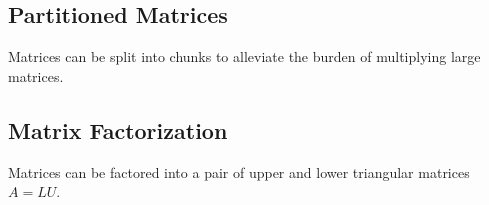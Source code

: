 \begin{card}
    \subsection{Partitioned Matrices}
    Matrices can be split into chunks to alleviate the burden of
    multiplying large matrices.

%
%
    \subsection{Matrix Factorization}
    Matrices can be factored into a pair of upper and lower triangular matrices
    $A = LU$.

\end{card}


